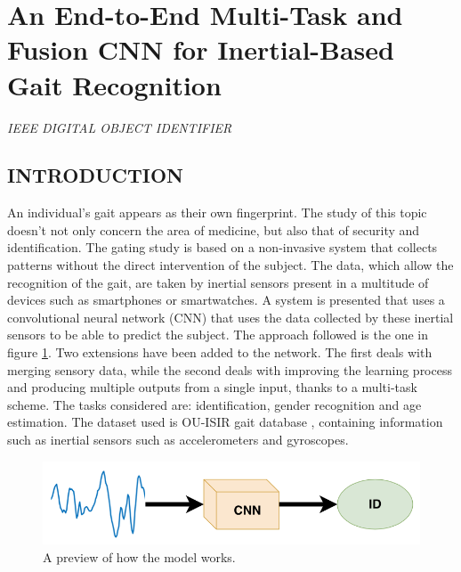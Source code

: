 \section{An End-to-End Multi-Task and Fusion CNN for Inertial-Based Gait Recognition}

\begin{flushleft}
    \author{
    Rubén Delgrado-Esca$ \tilde{n} $o,
    Francisco M. Castro,
    Julián Ramos Cózar,
    Manuel J. Marín-Jiménez,
    and Nicolás Guil
    }
\end{flushleft}

\begin{center}
    \emph{IEEE DIGITAL OBJECT IDENTIFIER}
\end{center}

\subsection{INTRODUCTION}
An individual's gait appears as their own fingerprint. The study of this 
topic doesn't not only concern the area of medicine, but also that of security 
and identification. The gating study is based on a non-invasive system that 
collects patterns without the direct intervention of the subject. The data, 
which allow the recognition of the gait, are taken by inertial sensors present 
in a multitude of devices such as smartphones or smartwatches. A system 
is presented that uses a convolutional neural network (CNN) that uses the 
data collected by these inertial sensors to be able to predict the subject. The 
approach followed is the one in figure \ref{fig:preview}. Two extensions have been added 
to the network. The first deals with merging sensory data, while the second 
deals with improving the learning process and producing multiple outputs 
from a single input, thanks to a multi-task scheme. The tasks considered 
are: identification, gender recognition and age estimation. The dataset used 
is OU-ISIR gait database \cite{0857651721}, containing information such as inertial sensors 
such as accelerometers and gyroscopes.
\begin{figure}[htbp]
    \centering
    \includegraphics[width = 0.6 \linewidth]{images/paper5/usecase.png}
    \centering
    \caption{A preview of how the model works.}
    \label{fig:preview}
\end{figure}


